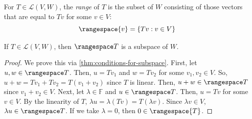 \documentclass{article}
\begin{document}
\begin{definition}[range]
  \label{def:range}
  For $T \in \mathcal{L}(V, W)$, the \textit{range} of $T$ is the
  subset of $W$ consisting of those vectors that are equal to $Tv$ for
  some $v \in V$:
  $$\rangespace{v} = \{Tv: v \in V\}$$
\end{definition}

\begin{theorem}
  \label{thm:the-range-is-a-subspace}
  If $T \in \mathcal{L}(V, W)$, then $\rangespace T$ is a subspace of $W$.
\end{theorem}
\begin{proof}
  We prove this via \cref{thm:conditions-for-subspace}. First, let $u,
  w \in \rangespace T$. Then, $u = Tv_1$ and $w = Tv_2$ for some $v_1,
  v_2 \in V$. So, $u + w = Tv_1 + Tv_2 = T(v_1 + v_2)$ since $T$ is
  linear. Then, $u + w \in \rangespace T$ since $v_1 + v_2 \in
  V$. Next, let $\lambda \in \mathbb{F}$ and $u \in \rangespace
  T$. Then, $u = Tv$ for some $v \in V$. By the linearity of $T$,
  $\lambda u = \lambda (Tv) = T(\lambda v)$. Since $\lambda v \in V$,
  $\lambda u \in \rangespace T$. If we take $\lambda = 0$, then $0 \in
  \rangespace {T}$.
\end{proof}
\end{document}
